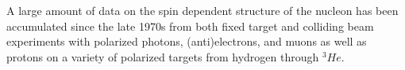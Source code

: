 A large %
amount of data on the %
spin dependent 
structure of the nucleon%
has been accumulated since the late 1970s %
from both fixed target and colliding beam experiments with polarized %
photons, (anti)electrons, and muons %
as well as protons on a variety of polarized targets %
from hydrogen through $^3He$. %



